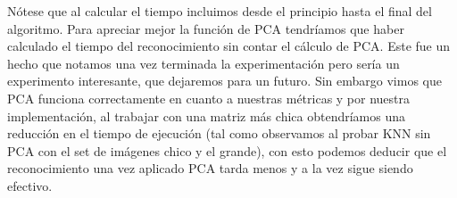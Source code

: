 Nótese que al calcular el tiempo incluimos desde el principio hasta el final del algoritmo. Para apreciar mejor la función de PCA tendríamos que haber calculado el tiempo del reconocimiento sin contar el cálculo de PCA. Este fue un hecho que notamos una vez terminada la experimentación pero sería un experimento interesante, que dejaremos para un futuro.\newline
Sin embargo vimos que PCA funciona correctamente en cuanto a nuestras métricas y por nuestra implementación, al trabajar con una matriz más chica obtendríamos una reducción en el tiempo de ejecución (tal como observamos al probar KNN sin PCA con el set de imágenes chico y el grande), con esto podemos deducir que el reconocimiento una vez aplicado PCA tarda menos y a la vez sigue siendo efectivo.


